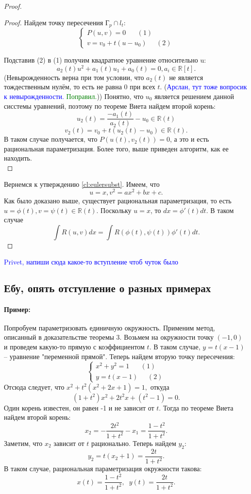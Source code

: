 \documentclass{article}
\theoremstyle{plain}
\theoremstyle{definition}
\theoremstyle{remark}
\begin{document}
\begin{proof}
\begin{proof}
Найдем точку пересечения Г$_p \cap l_t$:
\begin{equation*}
    \left\{
\begin{aligned}
P(u, v) = 0 \;\;\;\;\;\; (1)\\
v = v_0 + t(u - u_0)\;\;\;\;\; (2)
\end{aligned}
\right.
\end{equation*}

Подставив (2) в (1) получим квадратное уравнение относительно u: \[a_2(t)u^2 + a_1(t)u_1 + a_0(t) = 0, a_i \in \mathbb{R}[t].\] (Невырожденность верна при том условии, что $a_2(t)$ не является тождественным нулём, то есть не равна $0$ при всех $t$. (\textcolor{blue}{Арслан, тут тоже вопросик к невырожденности.} \textcolor{green}{Поправил.})) Понятно, что $u_0$ является решением данной сисстемы уравнений, поэтому по теореме Виета найдем второй корень: \[u_2(t) = \frac{-a_1(t)}{a_2(t)} - u_0 \in \mathbb{R}(t)\] \[v_2(t) = v_0 + t(u_2(t) - u_0) \in \mathbb{R}(t).\] В таком случае получается, что $P(u(t), v_2(t)) = 0$, а это и есть рациональная параметризация. Более того, выше приведен алгоритм, как ее находить.\\
\end{proof}
Вернемся к утверждению \ref{cl:eulersubst}. Имеем, что \[u = x, v^2 = ax^2 + bx + c.\] Как было доказано выше, существует рациональная параметризация, то есть $u = \phi(t), v = \psi(t) \in \mathbb{R}(t).$ Поскольку $u = x$, то $dx = \phi'(t)dt.$ В таком случае \[\int R(u, v)dx = \int R(\phi(t), \psi(t))\phi'(t)dt.\]


\end{proof}

\textcolor{blue}{Privet, напиши сюда какое-то вступление чтоб чуток было}
\subsection{Ебу, опять отступление о разных примерах}
\paragraph{Пример:} Попробуем параметризовать единичную окружность. Применим метод, описанный в доказательстве теоремы 3. Возьмем на окружности точку $(-1, 0)$ и проведем какую-то прямую с коэффициентом $t$. В таком случае, $y = t(x-1) $ -- уравнение "переменной прямой". Теперь найдем вторую точку пересечения:
\[
\left\{
\begin{aligned}
x^2 + y^2 = 1 \;\;\;\;\;\; (1)\\
y = t(x-1)\;\;\;\;\; (2)
\end{aligned}
\right.
\]
Отсюда следует, что $x^2 + t^2(x^2 + 2x + 1) = 1,$ откуда \[(1 + t^2)x^2 + 2t^2x + (t^2 - 1) = 0.\] Один корень известен, он равен -1 и не зависит от $t$. Тогда по теореме Виета найдем второй корень: \[x_2 = -\frac{2t^2}{1+t^2} -x_1 = \frac{1-t^2}{1+t^2}.\] Заметим, что $x_2$ зависит от $t$ рационально. Теперь найдем $y_2$: $$y_2 = t(x_2 + 1) = \frac{2t}{1+t^2}.$$ В таком случае, рациональная параметризация окружности такова: \[x(t) = \frac{1 - t^2}{1 + t^2},\;\; y(t) = \frac{2t}{1 + t^2}.\]
\end{document}
